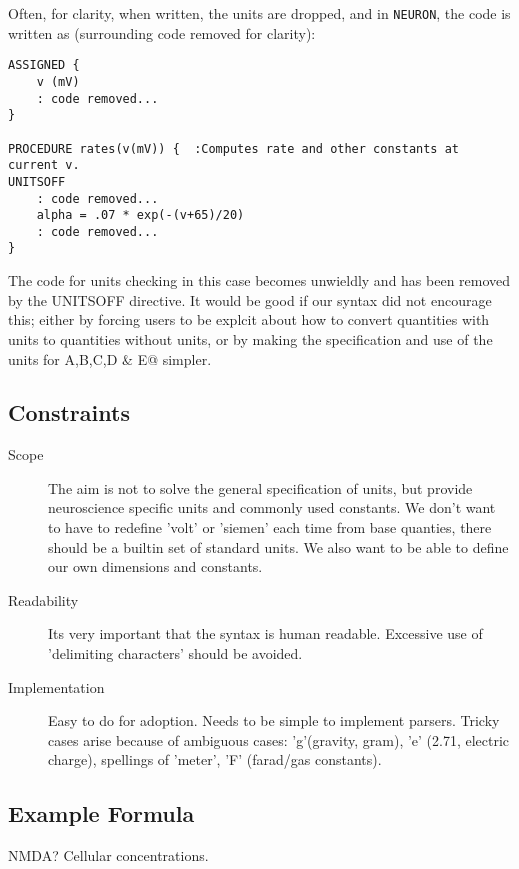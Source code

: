 \documentclass{article}
\begin{document}
\begin{description}
Often, for clarity, when written, the units are dropped, and in \verb|NEURON|, the code is written as (surrounding code removed for clarity):

\begin{lstlisting}
ASSIGNED {
    v (mV)
    : code removed...
}

PROCEDURE rates(v(mV)) {  :Computes rate and other constants at current v.
UNITSOFF
    : code removed...
    alpha = .07 * exp(-(v+65)/20)
    : code removed...
}
\end{lstlisting}
The code for units checking in this case becomes unwieldly and has been removed by the UNITSOFF directive. It would be good if our syntax did not encourage this; either by forcing users to be explcit about how to convert quantities with units to quantities without units, or by making the specification and use of the units for \verb@of A,B,C,D & E@ simpler.







\end{description}



\subsection{Constraints}
\begin{description}
\item[Scope] The aim is not to solve the general specification of units, but provide neuroscience specific units and commonly used constants. We don't want to have to redefine 'volt' or 'siemen' each time from base quanties, there should be a builtin set of standard units. We also want to be able to define our own dimensions and constants.
\item[Readability] Its very important that the syntax is human readable. Excessive use of 'delimiting characters' should be avoided.
\item[Implementation] Easy to do for adoption. Needs to be simple to implement parsers. Tricky cases arise because of ambiguous cases: 'g'(gravity, gram), 'e' (2.71, electric charge), spellings of 'meter', 'F' (farad/gas constants).
\end{description}

\subsection{Example Formula}
\begin{description}
\item NMDA? Cellular concentrations.
\end{description}
\end{document}
